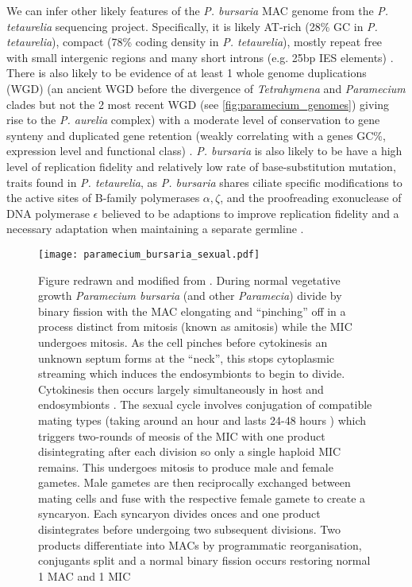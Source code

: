We can infer other likely features of the \textit{P. bursaria} MAC genome from the \textit{P. tetaurelia} sequencing project.
Specifically, it is likely AT-rich (28\% GC in \textit{P. tetaurelia}), compact (78\% coding density in \textit{P. tetaurelia}),
mostly repeat free with small intergenic regions and many short introns (e.g. 25bp IES elements) \citep{Aury2006}.  
There is also likely to be evidence of at least 1 whole genome duplications (WGD) (an ancient WGD before the divergence of 
\textit{Tetrahymena} and \textit{Paramecium} clades but not the 2 most recent WGD (see \cref{fig:paramecium_genomes}) 
giving rise to the \textit{P. aurelia} complex) with a moderate 
level of conservation to gene synteny and duplicated gene retention 
(weakly correlating with a genes GC\%, expression level and functional class) \citep{Aury2006,McGrath2014}.
\textit{P. bursaria} is also likely to be have a high level of replication fidelity and relatively low rate of base-substitution mutation,
traits found in \textit{P. tetaurelia}, as \textit{P. bursaria} shares ciliate specific modifications to the active sites
of B-family polymerases \(\alpha, \zeta\), and the proofreading exonuclease of DNA polymerase \(\epsilon\) believed to be adaptions to
improve replication fidelity and a necessary adaptation when maintaining a separate germline \citep{Sung2012}.

\begin{figure}[h!]
    \centering
    \caption[Life cycle of \textit{P. bursaria}]{
        Figure redrawn and modified from \citep{Duret2008}.
        During normal vegetative growth \textit{Paramecium bursaria} (and other \textit{Paramecia}) divide by binary fission with the MAC
        elongating and ``pinching'' off in a process distinct from mitosis (known as amitosis) while the MIC undergoes mitosis.
        As the cell pinches before cytokinesis an unknown septum forms at the ``neck'', this stops cytoplasmic streaming which induces
        the endosymbionts to begin to divide. Cytokinesis then occurs largely simultaneously in host and endosymbionts \citep{Kadono2004,Takahashi2007}.
        The sexual cycle involves conjugation of compatible mating types (taking around an hour and lasts 24-48 hours \citep{Jennings1939}) 
        which triggers two-rounds of meosis of the MIC with
        one product disintegrating after each division so only a single haploid MIC remains. This undergoes mitosis to produce male and
        female gametes. Male gametes are then reciprocally exchanged between mating cells and fuse with the respective female gamete to 
        create a syncaryon. Each syncaryon divides onces and one product disintegrates before undergoing two subsequent divisions.
        Two products differentiate into MACs by programmatic reorganisation, conjugants split and a normal binary fission occurs 
    restoring normal 1 MAC and 1 MIC \citep{Siegel1963} }%
    \texttt{[image: paramecium\_bursaria\_sexual.pdf]}
    \label{fig:pb_sex} 
\end{figure}

